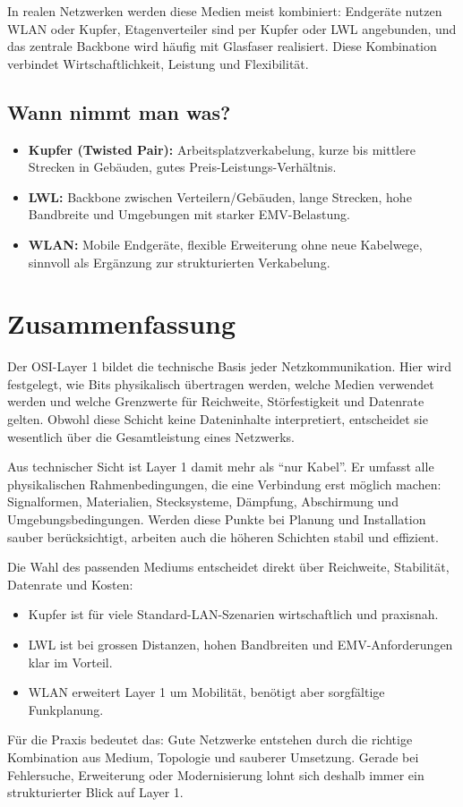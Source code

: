 \documentclass[11pt, oneside, numbers=nönddot]{scrbook}
\begin{document}
In realen Netzwerken werden diese Medien meist kombiniert: Endgeräte nutzen WLAN oder Kupfer, Etagenverteiler sind per Kupfer oder LWL angebunden, und das zentrale Backbone wird häufig mit Glasfaser realisiert. Diese Kombination verbindet Wirtschaftlichkeit, Leistung und Flexibilität.

\subsection*{Wann nimmt man was?}
\begin{itemize}
\item \textbf{Kupfer (Twisted Pair):} Arbeitsplatzverkabelung, kurze bis mittlere Strecken in Gebäuden, gutes Preis-Leistungs-Verhältnis.
\item \textbf{LWL:} Backbone zwischen Verteilern/Gebäuden, lange Strecken, hohe Bandbreite und Umgebungen mit starker EMV-Belastung.
\item \textbf{WLAN:} Mobile Endgeräte, flexible Erweiterung ohne neue Kabelwege, sinnvoll als Ergänzung zur strukturierten Verkabelung.
\end{itemize}
\newpage
\section{Zusammenfassung}
Der OSI-Layer 1 bildet die technische Basis jeder Netzkommunikation. Hier wird festgelegt, wie Bits physikalisch übertragen werden, welche Medien verwendet werden und welche Grenzwerte für Reichweite, Störfestigkeit und Datenrate gelten. Obwohl diese Schicht keine Dateninhalte interpretiert, entscheidet sie wesentlich über die Gesamtleistung eines Netzwerks.

Aus technischer Sicht ist Layer 1 damit mehr als ``nur Kabel''. Er umfasst alle physikalischen Rahmenbedingungen, die eine Verbindung erst möglich machen: Signalformen, Materialien, Stecksysteme, Dämpfung, Abschirmung und Umgebungsbedingungen. Werden diese Punkte bei Planung und Installation sauber berücksichtigt, arbeiten auch die höheren Schichten stabil und effizient.

Die Wahl des passenden Mediums entscheidet direkt über Reichweite, Stabilität, Datenrate und Kosten:
\begin{itemize}
\item Kupfer ist für viele Standard-LAN-Szenarien wirtschaftlich und praxisnah.
\item LWL ist bei grossen Distanzen, hohen Bandbreiten und EMV-Anforderungen klar im Vorteil.
\item WLAN erweitert Layer 1 um Mobilität, benötigt aber sorgfältige Funkplanung.
\end{itemize}

Für die Praxis bedeutet das: Gute Netzwerke entstehen durch die richtige Kombination aus Medium, Topologie und sauberer Umsetzung. Gerade bei Fehlersuche, Erweiterung oder Modernisierung lohnt sich deshalb immer ein strukturierter Blick auf Layer 1.
\end{document}
